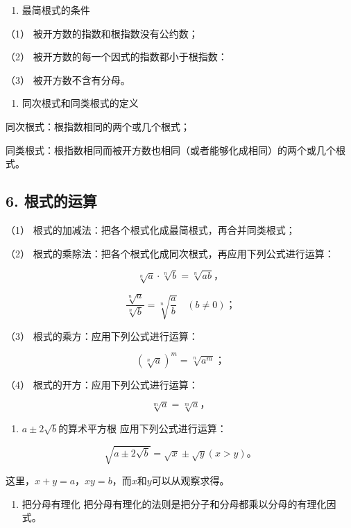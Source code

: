 \begin{enumerate}[start=4]
\item
  最简根式的条件
\end{enumerate}

（1） 被开方数的指数和根指数没有公约数；

（2） 被开方数的每一个因式的指数都小于根指数：

（3） 被开方数不含有分母。

\begin{enumerate}[start=6]
\item
  同次根式和同类根式的定义
\end{enumerate}

同次根式：根指数相同的两个或几个根式；

同类根式：根指数相同而被开方数也相同（或者能够化成相同）的两个或几个根式。

\subsection{6. 根式的运算}

（1） 根式的加减法：把各个根式化成最简根式，再合并同类根式；

（2） 根式的乘除法：把各个根式化成同次根式，再应用下列公式进行运算：

\[
\sqrt[n]{a} \cdot \sqrt[n]{b} = \sqrt[n]{a b}\text{，}
\]

\[
\frac{\sqrt[n]{a}}{\sqrt[n]{b}} = \sqrt[n]{\frac{a}{b}} \quad (b \neq 0)\text{；}
\]

（3） 根式的乘方：应用下列公式进行运算：

\[
(\sqrt[n]{a}) ^ {m} = \sqrt[n]{a ^ {m}}\text{；}
\]

（4） 根式的开方：应用下列公式进行运算：

\[
\sqrt[m]{a} = \sqrt[m]{a}\text{，}
\]

\begin{enumerate}[start=7]
\item
  \(a \pm 2\sqrt{b}\)的算术平方根 应用下列公式进行运算：
\end{enumerate}

\[
\sqrt {a \pm 2 \sqrt {b}} = \sqrt {x} \pm \sqrt {y} (x > y)\text{。}
\]

这里，\(x + y = a\)，\(xy = b\)，而\(x\)和\(y\)可以从观察求得。

\begin{enumerate}[start=8]
\item
  把分母有理化 把分母有理化的法则是把分子和分母都乘以分母的有理化因式。
\end{enumerate}

